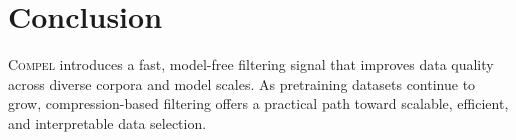 \section{Conclusion}\label{sec:conclusion}

\textsc{Compel} introduces a fast, model-free filtering signal that improves data quality across diverse corpora and model scales.
As pretraining datasets continue to grow, compression-based filtering offers a practical path toward scalable, efficient, and interpretable data selection.
